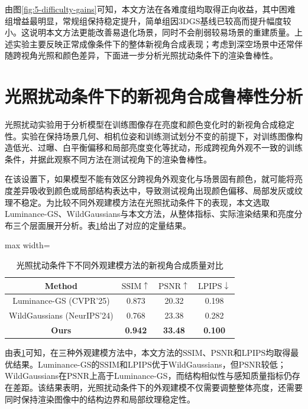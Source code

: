 由图\ref{fig:5-difficulty-gains}可知，本文方法在各难度组均取得正向收益，其中困难组增益最明显，常规组保持稳定提升，简单组因3DGS基线已较高而提升幅度较小。这说明本文方法更能改善易退化场景，同时不会削弱较易场景的重建质量。上述实验主要反映正常成像条件下的整体新视角合成表现；考虑到深空场景中还常伴随跨视角光照和颜色差异，下面进一步分析光照扰动条件下的渲染鲁棒性。

\section{光照扰动条件下的新视角合成鲁棒性分析}
光照扰动实验用于分析模型在训练图像存在亮度和颜色变化时的新视角合成稳定性。实验在保持场景几何、相机位姿和训练测试划分不变的前提下，对训练图像构造低光、过曝、白平衡偏移和局部亮度变化等扰动，形成跨视角外观不一致的训练条件，并据此观察不同方法在测试视角下的渲染鲁棒性。

在该设置下，如果模型不能有效区分跨视角外观变化与场景固有颜色，就可能将亮度差异吸收到颜色或局部结构表达中，导致测试视角出现颜色偏移、局部发灰或纹理不稳定。为比较不同外观建模方法在光照扰动条件下的表现，本文选取Luminance-GS、WildGaussians与本文方法，从整体指标、实际渲染结果和亮度分布三个层面展开分析。表\ref{tab:5-5}给出了对应的定量结果。

\begin{table}[H]
    \fontsize{10.5pt}{13.125pt}\selectfont
    \caption{光照扰动条件下不同外观建模方法的新视角合成质量对比}
    \centering\label{tab:5-5}
    \begin{adjustbox}{max width=\textwidth}
    \begin{tabular}{cccc}
        \toprule
        Method & $\mathrm{SSIM}\uparrow$ & $\mathrm{PSNR}\uparrow$ & $\mathrm{LPIPS}\downarrow$ \\
        \midrule
        Luminance-GS (CVPR’25) & 0.873 & 20.32 & 0.198 \\
        WildGaussians (NeurIPS’24) & 0.768 & 23.38 & 0.282 \\
        \textbf{Ours} & \textbf{0.942} & \textbf{33.48} & \textbf{0.100} \\
        \bottomrule
    \end{tabular}
    \end{adjustbox}
\end{table}
由表\ref{tab:5-5}可知，在三种外观建模方法中，本文方法的$\mathrm{SSIM}$、$\mathrm{PSNR}$和$\mathrm{LPIPS}$均取得最优结果。Luminance-GS的$\mathrm{SSIM}$和$\mathrm{LPIPS}$优于WildGaussians，但$\mathrm{PSNR}$较低；WildGaussians在$\mathrm{PSNR}$上高于Luminance-GS，而结构相似性与感知质量指标仍存在差距。该结果表明，光照扰动条件下的外观建模不仅需要调整整体亮度，还需要同时保持渲染图像中的结构边界和局部纹理稳定性。

